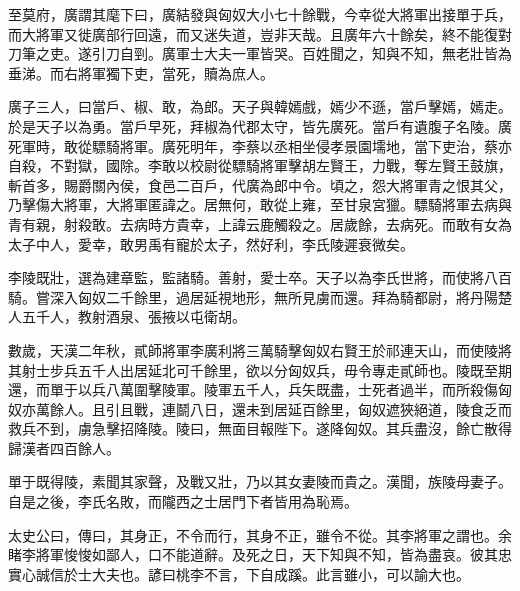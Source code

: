 至莫府，廣謂其麾下曰，廣結發與匈奴大小七十餘戰，今幸從大將軍出接單于兵，而大將軍又徙廣部行回遠，而又迷失道，豈非天哉。且廣年六十餘矣，終不能復對刀筆之吏。遂引刀自剄。廣軍士大夫一軍皆哭。百姓聞之，知與不知，無老壯皆為垂涕。而右將軍獨下吏，當死，贖為庶人。

廣子三人，曰當戶、椒、敢，為郎。天子與韓嫣戲，嫣少不遜，當戶擊嫣，嫣走。於是天子以為勇。當戶早死，拜椒為代郡太守，皆先廣死。當戶有遺腹子名陵。廣死軍時，敢從驃騎將軍。廣死明年，李蔡以丞相坐侵孝景園壖地，當下吏治，蔡亦自殺，不對獄，國除。李敢以校尉從驃騎將軍擊胡左賢王，力戰，奪左賢王鼓旗，斬首多，賜爵關內侯，食邑二百戶，代廣為郎中令。頃之，怨大將軍青之恨其父，乃擊傷大將軍，大將軍匿諱之。居無何，敢從上雍，至甘泉宮獵。驃騎將軍去病與青有親，射殺敢。去病時方貴幸，上諱云鹿觸殺之。居歲餘，去病死。而敢有女為太子中人，愛幸，敢男禹有寵於太子，然好利，李氏陵遲衰微矣。

李陵既壯，選為建章監，監諸騎。善射，愛士卒。天子以為李氏世將，而使將八百騎。嘗深入匈奴二千餘里，過居延視地形，無所見虜而還。拜為騎都尉，將丹陽楚人五千人，教射酒泉、張掖以屯衛胡。

數歲，天漢二年秋，貳師將軍李廣利將三萬騎擊匈奴右賢王於祁連天山，而使陵將其射士步兵五千人出居延北可千餘里，欲以分匈奴兵，毋令專走貳師也。陵既至期還，而單于以兵八萬圍擊陵軍。陵軍五千人，兵矢既盡，士死者過半，而所殺傷匈奴亦萬餘人。且引且戰，連鬬八日，還未到居延百餘里，匈奴遮狹絕道，陵食乏而救兵不到，虜急擊招降陵。陵曰，無面目報陛下。遂降匈奴。其兵盡沒，餘亡散得歸漢者四百餘人。

單于既得陵，素聞其家聲，及戰又壯，乃以其女妻陵而貴之。漢聞，族陵母妻子。自是之後，李氏名敗，而隴西之士居門下者皆用為恥焉。

太史公曰，傳曰，其身正，不令而行，其身不正，雖令不從。其李將軍之謂也。余睹李將軍悛悛如鄙人，口不能道辭。及死之日，天下知與不知，皆為盡哀。彼其忠實心誠信於士大夫也。諺曰桃李不言，下自成蹊。此言雖小，可以諭大也。